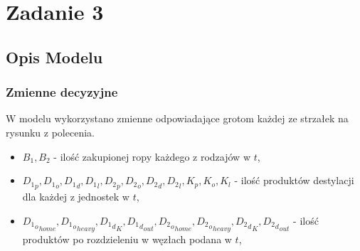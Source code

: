 \documentclass{article}
\begin{document}
\section{Zadanie 3}
\subsection{Opis Modelu}
\subsubsection{Zmienne decyzyjne}
W modelu wykorzystano zmienne odpowiadające grotom każdej ze strzałek na rysunku z polecenia.
\begin{itemize}
	\item $B_1,B_2$ - ilość zakupionej ropy każdego z rodzajów w $t$,
	\item ${D_1}_p,{D_1}_o,{D_1}_d,{D_1}_l,{D_2}_p,{D_2}_o,{D_2}_d,{D_2}_l,K_p,K_o,K_l$ - ilość produktów destylacji dla każdej z jednostek w $t$,
	\item ${{D_1}_o}_{home},{{D_1}_o}_{heavy},{{D_1}_d}_K,{{D_1}_d}_{out},{{D_2}_o}_{home},{{D_2}_o}_{heavy},{{D_2}_d}_K,{{D_2}_d}_{out}$ - ilość produktów po rozdzieleniu w węzłach podana w $t$,
\end{itemize}
\end{document}
